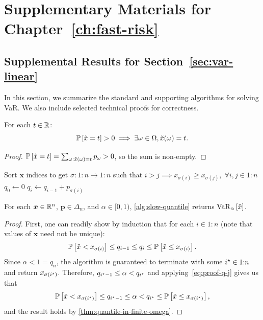 \chapter{Supplementary Materials for \texorpdfstring{Chapter~\ref{ch:fast-risk}}{Chapter 5}}\label{app:fast-risk}

\section{Supplemental Results for Section~\ref{sec:var-linear}} \label{sec:stand-var-algor}

In this section, we summarize the standard and supporting algorithms for solving VaR. We also include selected technical proofs for correctness.

\begin{lemma} \label{lem:prob-lumpy}
For each $t\in \Real$:
  \[
    \P{\tilde{x} = t} > 0
    \implies
\exists \omega \in \Omega, \tilde{x}(\omega) = t.
  \]
\end{lemma}
\begin{proof}
$\P{\tilde{x}=t} = \sum_{\omega: \tilde{x}(\omega)=t} p_\omega > 0$, so the sum is non-empty.
\end{proof}

\begin{algorithm}
\caption{Standard VaR algorithm}
\label{alg:slow-quantile}
\Input{$\bm{x}\in \Real^n$, $\bm{p}\in \Delta_n$, and $\alpha \in [0,1)$}
\Output{$\varo_{\alpha}[\tilde{x}]$}
Sort $\bm{x}$ indices to get $\sigma \colon 1{:}n \to 1{:}n$ such that $i > j \implies x_{\sigma(i)} \ge  x_{\sigma(j)}, \; \forall i, j \in 1{:}n$\;
$q_0 \gets 0$
 {
    $q_i \gets q_{i-1} + p_{\sigma(i)}$ \;
     {}
}
\end{algorithm}

\begin{proposition}
For each $\bm{x} \in \Real^n$, $\bm{p}\in \Delta_n$, and $\alpha\in [0,1)$, \cref{alg:slow-quantile} returns $\var{\alpha}{\tilde{x}}$.
\end{proposition}
\begin{proof}
  First, one can readily show by induction that for each $i\in 1{:}n$ (note that values of $\bm{x}$ need not be unique):
\begin{equation} \label{eq:proof-q-j}
  \P{\tilde{x} < x_{\sigma(i)}} \le q_{i-1} \le q_i \le \P{\tilde{x} \le x_{\sigma(i)}}.
\end{equation}
Since $\alpha < 1 = q_n$, the algorithm is guaranteed to terminate with some $i\opt \in 1{:}n$ and return $x_{\sigma(i\opt)}$. Therefore, $q_{i\opt-1} \le \alpha < q_{i\opt}$ and applying~\eqref{eq:proof-q-j} gives us that
\[
 \P{\tilde{x} < x_{\sigma(i\opt)}} \le q_{i\opt-1} \le \alpha < q_{i\opt} \le  \P{\tilde{x} \le x_{\sigma(i\opt)}},
\]
and the result holds by \cref{thm:quantile-in-finite-omega}.
\end{proof}

